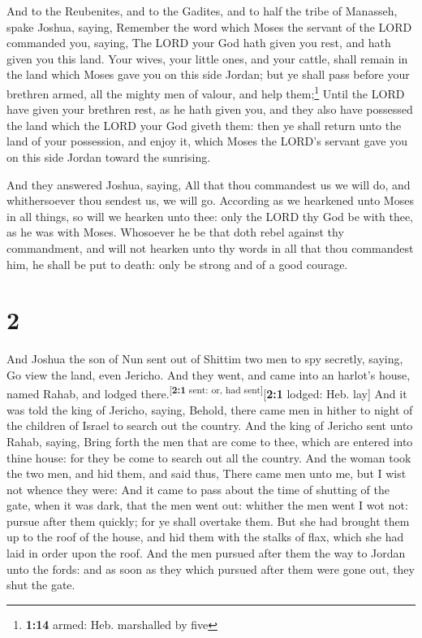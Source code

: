  And to the Reubenites, and to the Gadites, and to half
the tribe of Manasseh, spake Joshua, saying,  Remember
the word which Moses the servant of the LORD commanded you, saying, The
LORD your God hath given you rest, and hath given you this land.
 Your wives, your little ones, and your cattle, shall
remain in the land which Moses gave you on this side Jordan; but ye
shall pass before your brethren armed, all the mighty men of valour, and
help them;\footnote{\textbf{1:14} armed: Heb. marshalled by five}
 Until the LORD have given your brethren rest, as he hath
given you, and they also have possessed the land which the LORD your God
giveth them: then ye shall return unto the land of your possession, and
enjoy it, which Moses the LORD's servant gave you on this side Jordan
toward the sunrising.

 And they answered Joshua, saying, All that thou
commandest us we will do, and whithersoever thou sendest us, we will go.
 According as we hearkened unto Moses in all things, so
will we hearken unto thee: only the LORD thy God be with thee, as he was
with Moses.  Whosoever he be that doth rebel against thy
commandment, and will not hearken unto thy words in all that thou
commandest him, he shall be put to death: only be strong and of a good
courage.

\hypertarget{section-1}{%
\section{2}\label{section-1}}

 And Joshua the son of Nun sent out of Shittim two men to
spy secretly, saying, Go view the land, even Jericho. And they went, and
came into an harlot's house, named Rahab, and lodged
there.\textsuperscript{{[}\textbf{2:1} sent: or, had
sent{]}}{[}\textbf{2:1} lodged: Heb. lay{]}  And it was
told the king of Jericho, saying, Behold, there came men in hither to
night of the children of Israel to search out the country.
 And the king of Jericho sent unto Rahab, saying, Bring
forth the men that are come to thee, which are entered into thine house:
for they be come to search out all the country.  And the
woman took the two men, and hid them, and said thus, There came men unto
me, but I wist not whence they were:  And it came to pass
about the time of shutting of the gate, when it was dark, that the men
went out: whither the men went I wot not: pursue after them quickly; for
ye shall overtake them.  But she had brought them up to
the roof of the house, and hid them with the stalks of flax, which she
had laid in order upon the roof.  And the men pursued
after them the way to Jordan unto the fords: and as soon as they which
pursued after them were gone out, they shut the gate.

